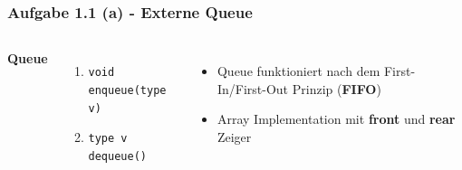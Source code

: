 \documentclass[aspectratio=169]{beamer}
\begin{document}
\begin{frame}
	\frametitle{Aufgabe 1.1 (a) - Externe Queue}
	\begin{columns}[c] %
	
	\textbf{Queue}
	\begin{enumerate}
	\item \texttt{void enqueue(type v)}
	\item \texttt{type v dequeue()}
	\end{enumerate}
	
	\begin{itemize}
		\item Queue funktioniert nach dem First-In/First-Out Prinzip (\textbf{FIFO})
		\item Array Implementation mit \textbf{front} und \textbf{rear} Zeiger
	\end{itemize}
	
	\end{columns}
	\end{frame}
\end{document}
